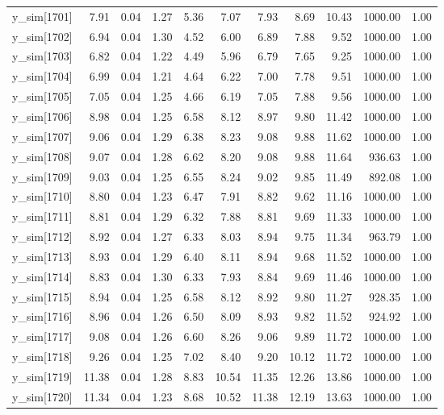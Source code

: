 \begin{table}[ht]
\begin{tabular}{rrrrrrrrrrr}
  y\_sim[1701] & 7.91 & 0.04 & 1.27 & 5.36 & 7.07 & 7.93 & 8.69 & 10.43 & 1000.00 & 1.00 \\ 
  y\_sim[1702] & 6.94 & 0.04 & 1.30 & 4.52 & 6.00 & 6.89 & 7.88 & 9.52 & 1000.00 & 1.00 \\ 
  y\_sim[1703] & 6.82 & 0.04 & 1.22 & 4.49 & 5.96 & 6.79 & 7.65 & 9.25 & 1000.00 & 1.00 \\ 
  y\_sim[1704] & 6.99 & 0.04 & 1.21 & 4.64 & 6.22 & 7.00 & 7.78 & 9.51 & 1000.00 & 1.00 \\ 
  y\_sim[1705] & 7.05 & 0.04 & 1.25 & 4.66 & 6.19 & 7.05 & 7.88 & 9.56 & 1000.00 & 1.00 \\ 
  y\_sim[1706] & 8.98 & 0.04 & 1.25 & 6.58 & 8.12 & 8.97 & 9.80 & 11.42 & 1000.00 & 1.00 \\ 
  y\_sim[1707] & 9.06 & 0.04 & 1.29 & 6.38 & 8.23 & 9.08 & 9.88 & 11.62 & 1000.00 & 1.00 \\ 
  y\_sim[1708] & 9.07 & 0.04 & 1.28 & 6.62 & 8.20 & 9.08 & 9.88 & 11.64 & 936.63 & 1.00 \\ 
  y\_sim[1709] & 9.03 & 0.04 & 1.25 & 6.55 & 8.24 & 9.02 & 9.85 & 11.49 & 892.08 & 1.00 \\ 
  y\_sim[1710] & 8.80 & 0.04 & 1.23 & 6.47 & 7.91 & 8.82 & 9.62 & 11.16 & 1000.00 & 1.00 \\ 
  y\_sim[1711] & 8.81 & 0.04 & 1.29 & 6.32 & 7.88 & 8.81 & 9.69 & 11.33 & 1000.00 & 1.00 \\ 
  y\_sim[1712] & 8.92 & 0.04 & 1.27 & 6.33 & 8.03 & 8.94 & 9.75 & 11.34 & 963.79 & 1.00 \\ 
  y\_sim[1713] & 8.93 & 0.04 & 1.29 & 6.40 & 8.11 & 8.94 & 9.68 & 11.52 & 1000.00 & 1.00 \\ 
  y\_sim[1714] & 8.83 & 0.04 & 1.30 & 6.33 & 7.93 & 8.84 & 9.69 & 11.46 & 1000.00 & 1.00 \\ 
  y\_sim[1715] & 8.94 & 0.04 & 1.25 & 6.58 & 8.12 & 8.92 & 9.80 & 11.27 & 928.35 & 1.00 \\ 
  y\_sim[1716] & 8.96 & 0.04 & 1.26 & 6.50 & 8.09 & 8.93 & 9.82 & 11.52 & 924.92 & 1.00 \\ 
  y\_sim[1717] & 9.08 & 0.04 & 1.26 & 6.60 & 8.26 & 9.06 & 9.89 & 11.72 & 1000.00 & 1.00 \\ 
  y\_sim[1718] & 9.26 & 0.04 & 1.25 & 7.02 & 8.40 & 9.20 & 10.12 & 11.72 & 1000.00 & 1.00 \\ 
  y\_sim[1719] & 11.38 & 0.04 & 1.28 & 8.83 & 10.54 & 11.35 & 12.26 & 13.86 & 1000.00 & 1.00 \\ 
  y\_sim[1720] & 11.34 & 0.04 & 1.23 & 8.68 & 10.52 & 11.38 & 12.19 & 13.63 & 1000.00 & 1.00 \\ 

\end{tabular}
\end{table}
